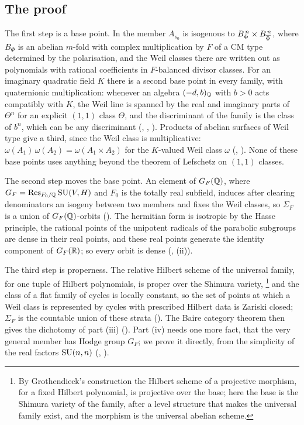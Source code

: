 \subsection{The proof}

The first step is a base point. In  the member $A_{s_{0}}$
is isogenous to $B_{\Phi}^{\,n}\times B_{\overline{\Phi}}^{\,n}$, where $B_{\Phi}$ is
an abelian $m$-fold with complex multiplication by $F$ of a CM type determined
by the polarisation, and the Weil classes there are written out as
polynomials with rational coefficients in $F$-balanced divisor classes. For
an imaginary quadratic field $K$ there is a second base point in every family,
with quaternionic multiplication: whenever an algebra $(-d,b)_{\mathbb{Q}}$ with
$b>0$ acts compatibly with $K$, the Weil line is spanned by the real and
imaginary parts of $\Theta^{n}$ for an explicit $(1,1)$ class $\Theta$, and
the discriminant of the family is the class of $b^{n}$, which can be any
discriminant (, ,
). Products of abelian surfaces of Weil type give a
third, since the Weil class is multiplicative:
$\omega(A_{1})\,\omega(A_{2})=\omega(A_{1}\times A_{2})$ for the
$K$-valued Weil class $\omega$ (, ). None
of these base points uses anything beyond the theorem of Lefschetz on $(1,1)$
classes.

The second step moves the base point. An element of $G_{F}(\mathbb{Q})$, where
$G_{F}=\operatorname{Res}_{F_{0}/\mathbb{Q}}\operatorname{SU}(V,H)$ and $F_{0}$ is the totally real subfield,
induces after clearing denominators an isogeny between two members and fixes
the Weil classes, so $\Sigma_{F}$ is a union of $G_{F}(\mathbb{Q})$-orbits
(). The hermitian form is isotropic by the Hasse
principle, the rational points of the unipotent radicals of the parabolic
subgroups are dense in their real points, and these real points generate the
identity component of $G_{F}(\mathbb{R})$; so every orbit is dense
(, (ii)).

The third step is properness. The relative Hilbert scheme of the universal
family, for one tuple of Hilbert polynomials, is proper over the Shimura
variety,%
\footnote{By Grothendieck's construction the Hilbert scheme of a projective
morphism, for a fixed Hilbert polynomial, is projective over the base; here
the base is the Shimura variety of the family, after a level structure that
makes the universal family exist, and the morphism is the universal abelian
scheme.}
and the class of a flat family of cycles is locally constant, so the
set of points at which a Weil class is represented by cycles with prescribed
Hilbert data is Zariski closed; $\Sigma_{F}$ is the countable union of these
strata (). The Baire category theorem then gives the
dichotomy of part (iii) (). Part (iv) needs one more
fact, that the very general member has Hodge group $G_{F}$; we prove it
directly, from the simplicity of the real factors $\operatorname{SU}(n,n)$
(, ).

